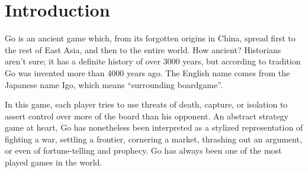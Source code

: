 \section{Introduction}

\begin{displayquote}
	Go is an ancient game which, from its forgotten origins in China, spread first
	to the rest of East Asia, and then to the entire world. How ancient? Historians
	aren't sure; it has a definite history of over 3000 years, but according to
	tradition Go was invented more than 4000 years ago. The English name comes from
	the Japanese name Igo, which means ``surrounding boardgame''.

	In this game, each player tries to use threats of death, capture, or isolation
	to assert control over more of the board than his opponent. An abstract strategy
	game at heart, Go has nonetheless been interpreted as a stylized representation
	of fighting a war, settling a frontier, cornering a market, thrashing out an
	argument, or even of fortune-telling and prophecy. Go has always been one of the
	most played games in the world. \parencite{sl_go}
\end{displayquote}
